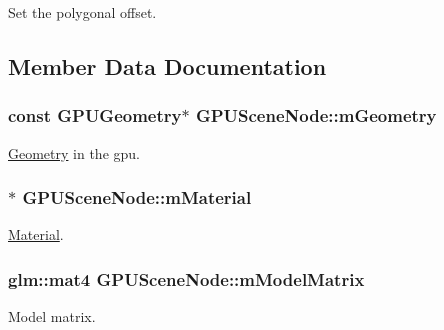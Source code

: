 Set the polygonal offset. 



\subsection{Member Data Documentation}
\hypertarget{class_g_p_u_scene_node_a5b5aecbfe949586c29750fef629ef671}{
\subsubsection[{m\+Geometry}]{\setlength{\rightskip}{0pt plus 5cm}const {\bf G\+P\+U\+Geometry}$\ast$ G\+P\+U\+Scene\+Node\+::m\+Geometry\hspace{0.3cm}{\ttfamily [private]}}}\label{class_g_p_u_scene_node_a5b5aecbfe949586c29750fef629ef671}


\hyperlink{class_geometry}{Geometry} in the gpu. 

\hypertarget{class_g_p_u_scene_node_af6fe090714f9a4d8ad409bed646a12a2}{
\subsubsection[{m\+Material}]{$\ast$ G\+P\+U\+Scene\+Node\+::m\+Material\hspace{0.3cm}{\ttfamily [private]}}}\label{class_g_p_u_scene_node_af6fe090714f9a4d8ad409bed646a12a2}


\hyperlink{class_material}{Material}. 

\hypertarget{class_g_p_u_scene_node_a44bf9ca8c8c92e4dce8498d0d1affd9d}{
\subsubsection[{m\+Model\+Matrix}]{\setlength{\rightskip}{0pt plus 5cm}glm\+::mat4 G\+P\+U\+Scene\+Node\+::m\+Model\+Matrix\hspace{0.3cm}{\ttfamily [private]}}}\label{class_g_p_u_scene_node_a44bf9ca8c8c92e4dce8498d0d1affd9d}


Model matrix. 

